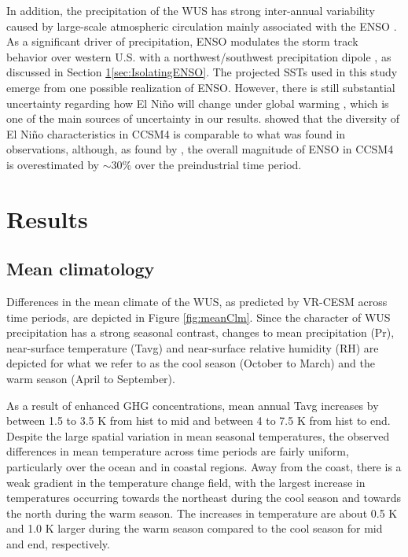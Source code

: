 \documentclass{ametsoc}
\begin{document}
In addition, the precipitation of the WUS has strong inter-annual variability caused by large-scale atmospheric circulation mainly associated with the ENSO \citep{leung2003hydroclimate}. As a significant driver of precipitation, ENSO modulates the storm track behavior over western U.S. with a northwest/southwest precipitation dipole \citep{gershunov1998interdecadal}, as discussed in Section \ref{sec:Results}\ref{sec:IsolatingENSO}. The projected SSTs used in this study emerge from one possible realization of ENSO. However, there is still substantial uncertainty regarding how El Ni\~no will change under global warming \citep{fedorov2000nino, guilyardi2009understanding}, which is one of the main sources of uncertainty in our results. \cite{capotondi2013enso} showed that the diversity of El Ni\~no characteristics in CCSM4 is comparable to what was found in observations, although, as found by \cite{deser2012enso}, the overall magnitude of ENSO in CCSM4 is overestimated by $\sim$30$\%$ over the preindustrial time period.


\section{Results} \label{sec:Results}

\subsection{Mean climatology} \label{sec:ResultsMeanClimatology}

Differences in the mean climate of the WUS, as predicted by VR-CESM across time periods, are depicted in Figure \ref{fig:meanClm}. Since the character of WUS precipitation has a strong seasonal contrast, changes to mean precipitation (Pr), near-surface temperature (Tavg) and near-surface relative humidity (RH) are depicted for what we refer to as the cool season (October to March) and the warm season (April to September).

As a result of enhanced GHG concentrations, mean annual Tavg increases by between 1.5 to 3.5 K from \textsf{hist} to \textsf{mid} and between 4 to 7.5 K from \textsf{hist} to \textsf{end}. Despite the large spatial variation in mean seasonal temperatures, the observed differences in mean temperature across time periods are fairly uniform, particularly over the ocean and in coastal regions.  Away from the coast, there is a weak gradient in the temperature change field, with the largest increase in temperatures occurring towards the northeast during the cool season and towards the north during the warm season.  The increases in temperature are about 0.5 K and 1.0 K larger during the warm season compared to the cool season for \textsf{mid} and \textsf{end}, respectively.
\end{document}
